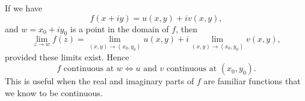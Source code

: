 \begin{note}
If we have
\[
f(x+iy) = u(x,y) + i v(x,y),
\]
and $w = x_0 + i y_0$ is a point in the domain of $f$, then
\[
\lim_{z \to w} f(z) = \lim_{(x,y) \to (x_0,y_0)} u(x,y)+ i \lim_{(x,y) \to (x_0,y_0)} v(x,y),
\]
provided these limits exist.  Hence
\[
f \text{ continuous at }w \Leftrightarrow u \text{ and } v \text{ continuous at } (x_0,y_0).
\]
This is useful when the real and imaginary parts of $f$ are familiar functions that we know to be continuous.
\end{note}



\endinput


